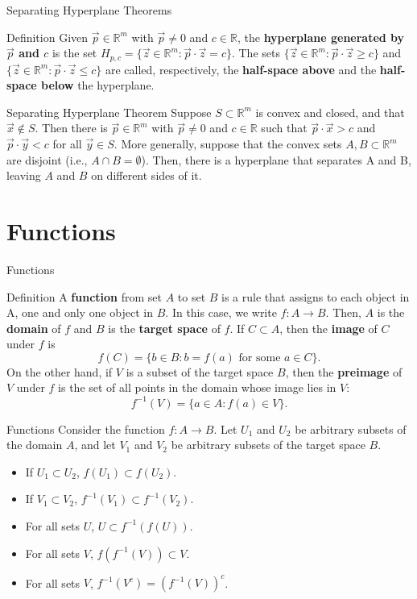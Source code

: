 \documentclass{beamer}
\begin{document}
\begin{frame}{Separating Hyperplane Theorems}
    \begin{block}{Definition}
Given $\vec{p}\in \mathbb{R}^m$ with $\vec{p}\neq 0$ and $c\in \mathbb{R}$, the \textbf{hyperplane generated by $\vec{p}$ and $c$}   is the set $H_{p,c}=\{\vec{z}\in \mathbb{R}^m:\vec{p}\cdot \vec{z}=c\} $. The sets $\{\vec{z}\in \mathbb{R}^m:\vec{p}\cdot \vec{z}\geq c\} $ and $\{\vec{z}\in \mathbb{R}^m:\vec{p}\cdot \vec{z}\leq c\} $ are called, respectively, the \textbf{half-space above} and the \textbf{half-space below }the hyperplane. 
    \end{block}
    \begin{block}{Separating Hyperplane Theorem}
    Suppose $S\subset \mathbb{R}^m$ is convex and closed, and that $\vec{x}\notin S$. Then there is $\vec{p}\in \mathbb{R}^m$ with $\vec{p}\neq 0$ and $c\in \mathbb{R}$ such that $\vec{p}\cdot \vec{x}>c$ and $\vec{p}\cdot \vec{y}<c$ for all $\vec{y}\in S$. More generally, suppose that the convex sets $A, B\subset \mathbb{R}^m$ are disjoint (i.e., $A\cap B=\emptyset$). Then, there is a hyperplane that separates A and B, leaving $A$ and $B$ on different sides of it. 
    \end{block}
\end{frame}
\section{Functions}
\begin{frame}{Functions}
   \begin{block}{Definition} A \textbf{function} from set $A$ to set $B$ is a rule that assigns to each object in A, one and only one object in $B$. In this case, we write $f:A\to B$. Then, $A$ is the \textbf{domain } of $f$ and $B$ is the \textbf{target space} of $f$. If $C\subset A$, then the \textbf{image} of $C$ under $f$ is 
   \[f(C)=\{b\in B:b=f(a) \text{ for some }a \in C\}. 
   \]
   On the other hand, if $V$ is a subset of the target space $B$, then the \textbf{preimage} of $V$ under $f$ is the set of all points in the domain whose image lies in $V$:
   \[f^{-1}(V)=\{a\in A: f(a)\in V\}.
   \]
   \end{block}
   
  \end{frame}

\begin{frame}{Functions}
Consider the function $f:A\to B$. Let $U_1$ and $U_2$ be arbitrary subsets of the domain $A$, and let $V_1$ and $V_2$ be arbitrary subsets of the target space $B$. 

\begin{itemize}
    \item If $U_1\subset U_2$, $f(U_1)\subset f(U_2)$.
    \item If $V_1 \subset V_2$, $f^{-1}(V_1)\subset f^{-1}(V_2)$.
    \item For all sets $U$, $U\subset f^{-1}(f(U))$.
    \item For all sets $V$, $f(f^{-1}(V))\subset V$.
    \item For all sets $V$, $f^{-1}(V^c)=(f^{-1}(V))^c$.
\end{itemize}
  \end{frame}
\end{document}
